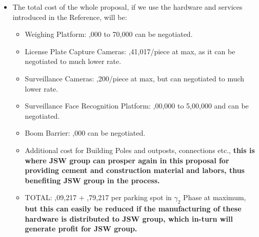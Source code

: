\documentclass[a4paper,11pt]{article}
\begin{document}
\begin{itemize}
\item{The total cost of the whole proposal, if we use the hardware and services introduced in the Reference, will be: }
\begin{itemize}
\item{Weighing Platform: ,000 to 70,000 can be negotiated.}
\item{License Plate Capture Cameras: ,41,017/piece at max, as it can be negotiated to much lower rate.}
\item{Surveillance Cameras: ,200/piece at max, but can negotiated to much lower rate.}
\item{Surveillance Face Recognition Platform: ,00,000 to 5,00,000 and can be negotiated.}
\item{Boom Barrier: ,000 can be negotiated.}
\item{Additional cost for Building Poles and outposts, connections etc., \textbf{this is where JSW group can prosper again in this proposal for providing cement and construction material and labors, thus benefiting JSW group in the process.}}
\item{TOTAL: ,09,217 + ,79,217 per parking spot in $\gamma_2$ Phase at maximum, \textbf{but this can easily be reduced if the manufacturing of these hardware is distributed to JSW group, which in-turn will generate profit for JSW group.}}
\end{itemize}
\end{itemize}
\newpage
\end{document}
